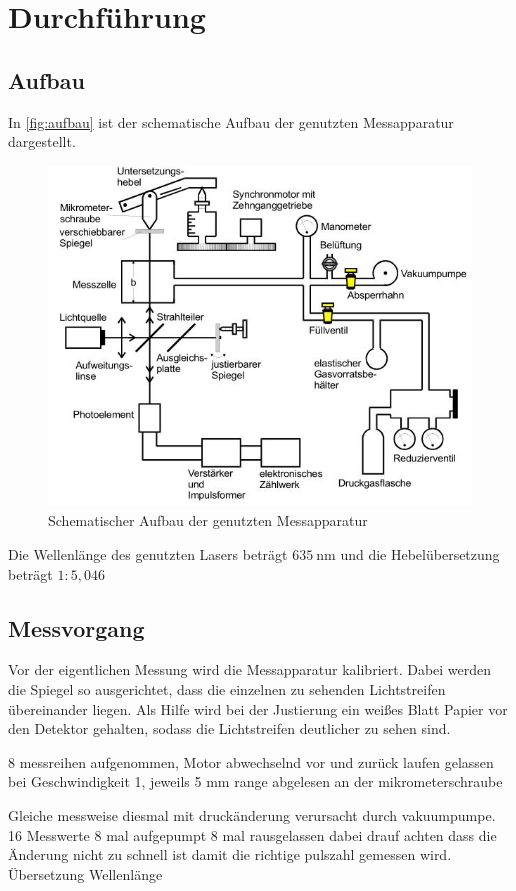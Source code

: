 \section{Durchführung}
\label{sec:Durchführung}
\subsection{Aufbau}

In \autoref{fig:aufbau} ist der schematische Aufbau der genutzten Messapparatur dargestellt. 
\begin{figure}[H]
\centering
\includegraphics[width=\textwidth]{graphics/aufbau.JPG}
\caption{Schematischer Aufbau der genutzten Messapparatur \cite{anleitung}}
\label{fig:aufbau}
\end{figure}
\noindent
Die Wellenlänge des genutzten Lasers beträgt $\SI{635}{\nano\meter}$ und die Hebelübersetzung beträgt $1:5,046$
\subsection{Messvorgang}
Vor der eigentlichen Messung wird die Messapparatur kalibriert. Dabei werden die Spiegel so ausgerichtet, dass die einzelnen zu sehenden Lichtstreifen übereinander liegen. Als Hilfe wird bei der Justierung ein weißes Blatt Papier vor den Detektor gehalten, sodass die Lichtstreifen deutlicher zu sehen sind.

8 messreihen aufgenommen, Motor abwechselnd vor und zurück laufen gelassen
bei Geschwindigkeit 1, jeweils 5 mm range abgelesen an der
mikrometerschraube

Gleiche messweise diesmal mit druckänderung verursacht durch vakuumpumpe.
16 Messwerte 8 mal aufgepumpt 8 mal rausgelassen dabei drauf achten dass
die Änderung nicht zu schnell ist damit die richtige pulszahl gemessen
wird.
Übersetzung Wellenlänge
